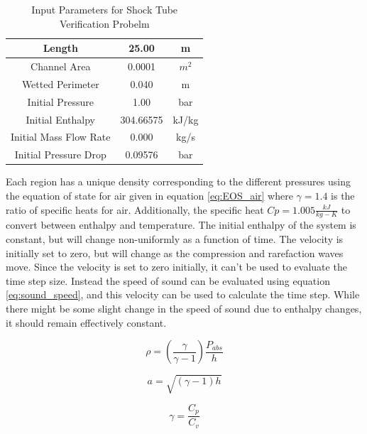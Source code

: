     \begin{table}[!h]
    	\center
    	\label{table:ST_Params}
    	\caption{Input Parameters for Shock Tube Verification Probelm}
    	\begin{tabular}{|c|c|c|}
    		\hline
	    	Length 	  				&  25.00	& m 		\\ \hline 
	    	Channel Area			&  0.0001	& $m^{2}$	\\ \hline
	    	Wetted Perimeter		&  0.040	& m			\\ \hline
	    	Initial Pressure  		&  1.00		& bar		\\ \hline
	    	Initial Enthalpy		&  304.66575& kJ/kg		\\ \hline
	    	Initial Mass Flow Rate 	&  0.000	& kg/s		\\ \hline
	    	Initial Pressure Drop	&  0.09576  & bar 		\\ \hline
    	\end{tabular}
    \end{table}    
    
    Each region has a unique density corresponding to the different pressures
    using the equation of state for air given in equation \ref{eq:EOS_air} where $\gamma
    = 1.4$ is the ratio of specific heats for air. Additionally, the specific
    heat $Cp = 1.005 \frac{kJ}{kg-K}$ to convert between enthalpy and
    temperature. The initial enthalpy of the system is constant, but will change
    non-uniformly as a function of time. The velocity is initially set to zero,
    but will change as the compression and rarefaction waves move. Since the
    velocity is set to zero initially, it can't be used to evaluate the time
    step size. Instead the speed of sound can be evaluated using equation
    \ref{eq:sound_speed}, and this velocity can be used to calculate the time
    step. While there might be some slight change in the speed of sound due to
    enthalpy changes, it should remain effectively constant.
    
    \begin{equation}
    \label{eq:EOS_air}
    	\rho = \left( \frac{\gamma}{\gamma - 1} \right) \frac{P_{abs}}{h} 
    \end{equation}
    
    \begin{equation}
    \label{eq:sound_speed}
    a = \sqrt{ \left( \gamma - 1 \right) h }
    \end{equation}
    
    \begin{equation}
    \gamma = \frac{C_{p}}{C_{v}}
    \end{equation}
    
